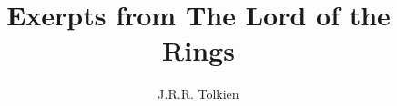 \documentclass[12pt,leqno]{book}
\begin{document}
\title{Exerpts from The Lord of the Rings}
\author{J.R.R. Tolkien}
\maketitle

\tableofcontents




\end{document}
